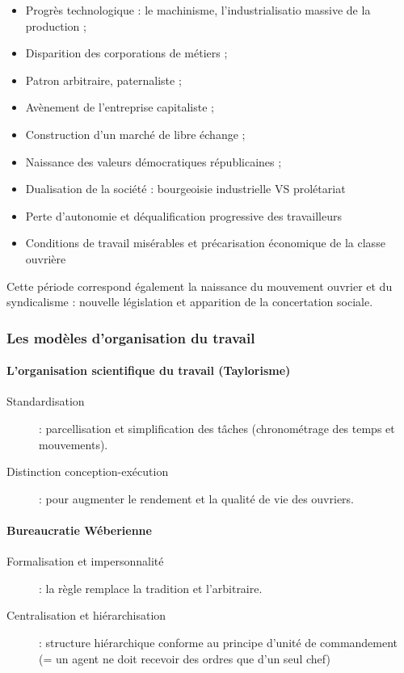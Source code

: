 \documentclass[12pt]{article}
\begin{document}
	  \begin{itemize}
	   \item Progrès technologique : le machinisme, l'industrialisatio massive de la production ;
	   \item Disparition des corporations de métiers ;
	   \item Patron arbitraire, paternaliste ;
	   \item Avènement de l'entreprise capitaliste ;
	   \item Construction d'un marché de libre échange ;
	   \item Naissance des valeurs démocratiques républicaines ;
	   \item Dualisation de la société : bourgeoisie industrielle VS prolétariat
	   \item Perte d'autonomie et déqualification progressive des travailleurs
	   \item Conditions de travail misérables et précarisation économique de la classe ouvrière
	  \end{itemize}
	  
	  Cette période correspond également la naissance du mouvement ouvrier et du syndicalisme : nouvelle législation et apparition de la concertation sociale.

	  \subsubsection{Les modèles d'organisation du travail}
	  
	  \paragraph{L'organisation scientifique du travail (Taylorisme)}
	  \begin{description}
	   \item[Standardisation] : parcellisation et simplification des tâches (chronométrage des temps et mouvements).
	   \item[Distinction conception-exécution] : pour augmenter le rendement et la qualité de vie des ouvriers.
	  \end{description}
	  
	  \paragraph{Bureaucratie Wéberienne}
	  \begin{description}
	   \item[Formalisation et impersonnalité] : la règle remplace la tradition et l'arbitraire.
	   \item[Centralisation et hiérarchisation] : structure hiérarchique conforme au principe d'unité de commandement (= un agent ne doit recevoir des ordres que d'un seul chef) \newline
	  \end{description}
	  
\end{document}
